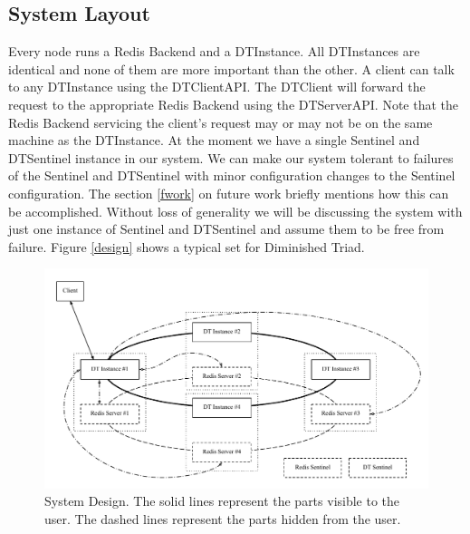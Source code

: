 \documentclass[10pt,twocolumn,letterpaper]{article}
\begin{document}
\subsection{System Layout}
Every node runs a Redis Backend and a DTInstance. All DTInstances are identical and none of them are more important than the other. A client can talk to any DTInstance using the DTClientAPI. The DTClient will forward the request to the appropriate Redis Backend using the DTServerAPI. Note that the Redis Backend servicing the client's request may or may not be on the same machine as the DTInstance.
At the moment we have a single Sentinel and DTSentinel instance in our system. We can make our system tolerant to failures of the Sentinel and DTSentinel with minor configuration changes to the Sentinel configuration. The section \ref{fwork} on future work briefly mentions how this can be accomplished. Without loss of generality we will be discussing the system with just one instance of Sentinel and DTSentinel and assume them to be free from failure. Figure \ref{design} shows a typical set for Diminished Triad.

\begin{figure}[htb]
  \centering
  \includegraphics[scale=0.75]{impl3.pdf}
  \caption{System Design. The solid lines represent the parts visible to the user. The dashed lines represent the parts hidden from the user.}
\end{figure}
\end{document}
